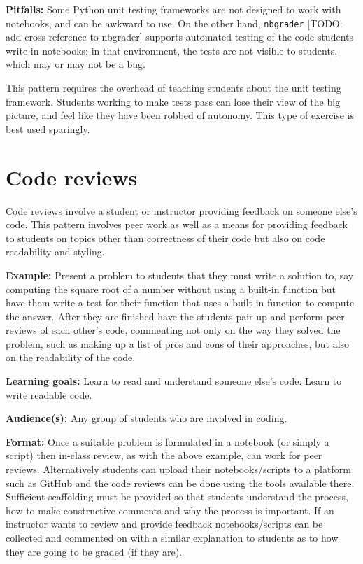 \documentclass[]{book}
\begin{document}
\textbf{Pitfalls:}
Some Python unit testing frameworks are not designed to work with notebooks,
and can be awkward to use. On the other hand, \texttt{nbgrader} {[}TODO: add cross
reference to nbgrader{]} supports automated testing of the code students write in
notebooks; in that environment, the tests are not visible to students, which
may or may not be a bug.

This pattern requires the overhead of teaching students about the unit testing
framework. Students working to make tests pass can lose their view of the big
picture, and feel like they have been robbed of autonomy. This type of exercise
is best used sparingly.

\hypertarget{code-reviews}{%
\section{Code reviews}\label{code-reviews}}

Code reviews involve a student or instructor providing feedback on someone
else's code. This pattern involves peer work as well as a means for providing
feedback to students on topics other than correctness of their code but also on
code readability and styling.

\textbf{Example:}
Present a problem to students that they must write a solution to, say computing
the square root of a number without using a built-in function but have them
write a test for their function that uses a built-in function to compute the
answer. After they are finished have the students pair up and perform peer
reviews of each other's code, commenting not only on the way they solved the
problem, such as making up a list of pros and cons of their approaches, but
also on the readability of the code.

\textbf{Learning goals:}
Learn to read and understand someone else's code. Learn to write readable code.

\textbf{Audience(s):}
Any group of students who are involved in coding.

\textbf{Format:}
Once a suitable problem is formulated in a notebook (or simply a script) then
in-class review, as with the above example, can work for peer reviews.
Alternatively students can upload their notebooks/scripts to a platform such as
GitHub and the code reviews can be done using the tools available there.
Sufficient scaffolding must be provided so that students understand the
process, how to make constructive comments and why the process is important. If
an instructor wants to review and provide feedback notebooks/scripts can be
collected and commented on with a similar explanation to students as to how
they are going to be graded (if they are).
\end{document}

